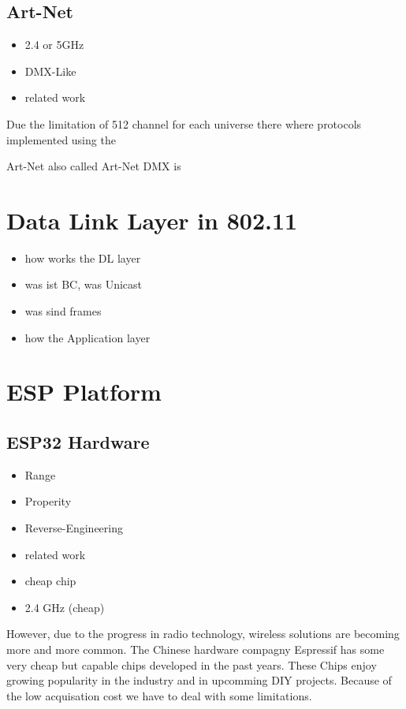 \documentclass[]{ccs-thesis}
\begin{document}
\subsection*{Art-Net}
\label{sec:artnet}
\begin{itemize}
\item 2.4 or 5GHz
\item DMX-Like
\item related work
\end{itemize}

Due the limitation of 512 channel for each universe there where protocols implemented using the 


Art-Net also called Art-Net DMX is 

\section{Data Link Layer in 802.11}
\begin{itemize}
	\item how works the DL layer
	\item was ist BC, was Unicast
	\item was sind frames
	\item how the Application layer
\end{itemize}

\section{ESP Platform}

\subsection*{ESP32 Hardware}
\begin{itemize}
\item Range
\item Properity
\item Reverse-Engineering 
\item related work
\item cheap chip
\item 2.4 GHz (cheap)
\end{itemize}
However, due to the progress in radio technology, wireless solutions are becoming more and more common. 
The Chinese hardware compagny Espressif has some very cheap but capable chips developed in the past years.
These Chips enjoy growing popularity in the industry and in upcomming DIY projects.
Because of the low acquisation cost we have to deal with some limitations.
\end{document}

